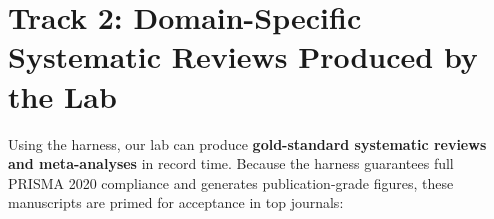 \documentclass[10pt,a4paper]{article}
\begin{document}
\newpage
\section{Track 2: Domain-Specific Systematic Reviews Produced by the Lab}

Using the harness, our lab can produce \textbf{gold-standard systematic reviews and meta-analyses} in record time. Because the harness guarantees full PRISMA 2020 compliance and generates publication-grade figures, these manuscripts are primed for acceptance in top journals:

\vspace{4pt}
\end{document}
